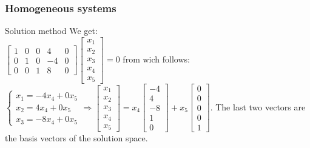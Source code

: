 \begin{frame}
	\frametitle{Homogeneous systems}
	\begin{block}{Solution method}
		We get:\\
		$\begin{bmatrix}
		1 & 0 & 0 & 4 & 0\\
		0 & 1 & 0 & -4 & 0\\
		0 & 0 & 1 & 8 & 0
		\end{bmatrix}\begin{bmatrix}
		x_1\\ x_2\\ x_3\\ x_4\\ x_5
		\end{bmatrix}=0$ from wich follows:\\
		$\begin{cases}
		x_1=-4x_4+0x_5\\
		x_2=4x_4+0x_5\\
		x_3=-8x_4+0x_5
		\end{cases} \Rightarrow \begin{bmatrix}
		x_1\\ x_2\\ x_3\\ x_4\\ x_5
		\end{bmatrix}=x_4\begin{bmatrix}
		-4\\4\\-8\\1\\0
		\end{bmatrix}+x_5\begin{bmatrix}
		0\\0\\0\\0\\1
		\end{bmatrix}$. The last two vectors are the basis vectors of the solution space.
	\end{block}
\end{frame}


